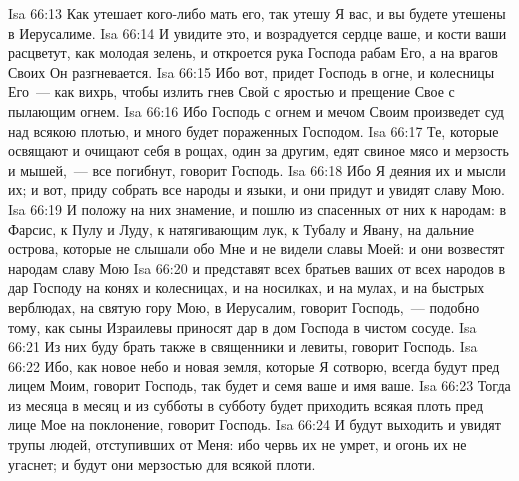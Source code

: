 \vs Isa 66:13 Как утешает кого-либо мать его, так утешу Я вас, и вы будете утешены в Иерусалиме.
\vs Isa 66:14 И увидите это, и возрадуется сердце ваше, и кости ваши расцветут, как молодая зелень, и откроется рука Господа рабам Его, а на врагов Своих Он разгневается.
\vs Isa 66:15 Ибо вот, придет Господь в огне, и колесницы Его~--- как вихрь, чтобы излить гнев Свой с яростью и прещение Свое с пылающим огнем.
\vs Isa 66:16 Ибо Господь с огнем и мечом Своим произведет суд над всякою плотью, и много будет пораженных Господом.
\vs Isa 66:17 Те, которые освящают и очищают себя в рощах, один за другим, едят свиное мясо и мерзость и мышей,~--- все погибнут, говорит Господь.
\vs Isa 66:18 Ибо Я  деяния их и мысли их; и вот, приду собрать все народы и языки, и они придут и увидят славу Мою.
\vs Isa 66:19 И положу на них знамение, и пошлю из спасенных от них к народам: в Фарсис, к Пулу и Луду, к натягивающим лук, к Тубалу и Явану, на дальние острова, которые не слышали обо Мне и не видели славы Моей: и они возвестят народам славу Мою
\vs Isa 66:20 и представят всех братьев ваших от всех народов в дар Господу на конях и колесницах, и на носилках, и на мулах, и на быстрых верблюдах, на святую гору Мою, в Иерусалим, говорит Господь,~--- подобно тому, как сыны Израилевы приносят дар в дом Господа в чистом сосуде.
\vs Isa 66:21 Из них буду брать также в священники и левиты, говорит Господь.
\vs Isa 66:22 Ибо, как новое небо и новая земля, которые Я сотворю, всегда будут пред лицем Моим, говорит Господь, так будет и семя ваше и имя ваше.
\vs Isa 66:23 Тогда из месяца в месяц и из субботы в субботу будет приходить всякая плоть пред лице Мое на поклонение, говорит Господь.
\vs Isa 66:24 И будут выходить и увидят трупы людей, отступивших от Меня: ибо червь их не умрет, и огонь их не угаснет; и будут они мерзостью для всякой плоти.
